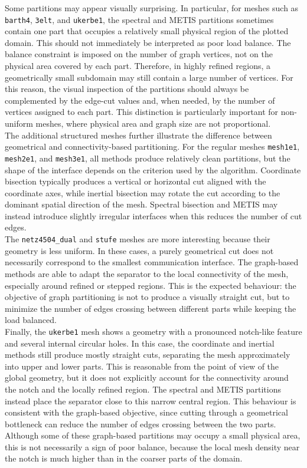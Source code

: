 \documentclass[unicode,10pt,a4paper,oneside,numbers=endperiod,openany]{scrartcl}
\begin{document}
Some partitions may appear visually surprising. In particular, for meshes such as \texttt{barth4},
\texttt{3elt}, and \texttt{ukerbe1}, the spectral and METIS partitions sometimes contain one part that
occupies a relatively small physical region of the plotted domain. This should not immediately be
interpreted as poor load balance. The balance constraint is imposed on the number of graph vertices,
not on the physical area covered by each part. Therefore, in highly refined regions, a geometrically small
subdomain may still contain a large number of vertices. For this reason, the visual inspection of the
partitions should always be complemented by the edge-cut values and, when needed, by the number of
vertices assigned to each part. This distinction is particularly important for non-uniform meshes, where
physical area and graph size are not proportional.\\

The additional structured meshes further illustrate the difference between geometrical and
connectivity-based partitioning. For the regular meshes \texttt{mesh1e1}, \texttt{mesh2e1}, and
\texttt{mesh3e1}, all methods produce relatively clean partitions, but the shape of the interface
depends on the criterion used by the algorithm. Coordinate bisection typically produces a vertical
or horizontal cut aligned with the coordinate axes, while inertial bisection may rotate the cut
according to the dominant spatial direction of the mesh. Spectral bisection and METIS may instead
introduce slightly irregular interfaces when this reduces the number of cut edges.\\

The \texttt{netz4504\_dual} and \texttt{stufe} meshes are more interesting because their geometry is
less uniform. In these cases, a purely geometrical cut does not necessarily correspond to the
smallest communication interface. The graph-based methods are able to adapt the separator to
the local connectivity of the mesh, especially around refined or stepped regions. This is the
expected behaviour: the objective of graph partitioning is not to produce a visually straight cut,
but to minimize the number of edges crossing between different parts while keeping the load
balanced.\\

Finally, the \texttt{ukerbe1} mesh shows a geometry with a pronounced notch-like feature and
several internal circular holes. In this case, the coordinate and inertial methods still produce
mostly straight cuts, separating the mesh approximately into upper and lower parts. This is
reasonable from the point of view of the global geometry, but it does not explicitly account for
the connectivity around the notch and the locally refined region. The spectral and METIS
partitions instead place the separator close to this narrow central region. This behaviour is
consistent with the graph-based objective, since cutting through a geometrical bottleneck can
reduce the number of edges crossing between the two parts. Although some of these graph-based
partitions may occupy a small physical area, this is not necessarily a sign of poor balance, because
the local mesh density near the notch is much higher than in the coarser parts of the domain.\\
\end{document}
